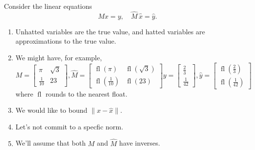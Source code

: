 \documentclass[usenames,dvipsnames,fleqn]{beamer}
\DeclareMathOperator{\fl}{fl}
\theoremstyle{definition}
\begin{document}
\begin{frame}
Consider the linear equations
\[
   M x = y, \quad \widehat M  \, \widehat x = \widehat y.
\]

\begin{enumerate}

\item Unhatted variables are the true value, and hatted variables are approximations to the true value.

\item We might have, for example,
\[
   M = \begin{bmatrix} \pi & \sqrt{3} \\ \frac{1}{10} & 23 \end{bmatrix},  
   \widehat M =   \begin{bmatrix} \fl(\pi) & \fl(\sqrt{3}) \\ \fl(\frac{1}{10}) & \fl(23) \end{bmatrix}
   y = \begin{bmatrix} \frac{2}{3} \\ \frac{1}{42} \end{bmatrix}, 
   \widehat y = \begin{bmatrix} \fl(\frac{2}{3}) \\ \fl(\frac{1}{42}) \end{bmatrix} 
   \]
where \(\fl\) rounds to the nearest float.

\item We would like to bound \( \| x - \widehat x \| \).

\item Let's not commit to a specfic norm.

\item We'll assume that both \(M\) and \(\widehat M \) have inverses.
\end{enumerate}

\end{frame}
\end{document}
